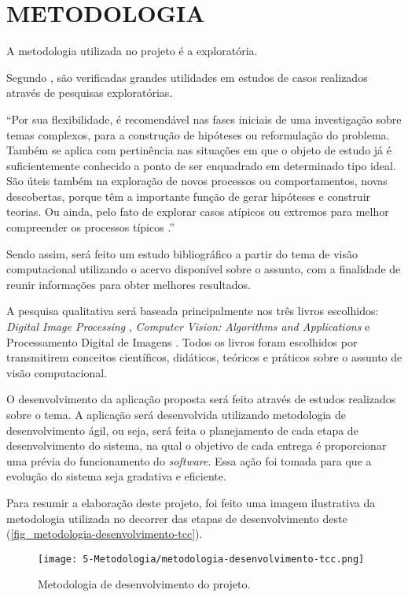 \chapter{\textbf{METODOLOGIA}}

A metodologia utilizada no projeto é a exploratória.

Segundo , são verificadas grandes utilidades em estudos de casos realizados através de pesquisas exploratórias.

\begin{citacao}
“Por sua flexibilidade, é recomendável nas fases iniciais de uma investigação sobre temas complexos, para a construção de hipóteses ou reformulação do problema. Também se aplica com pertinência nas situações em que o objeto de estudo já é suficientemente conhecido a ponto de ser enquadrado em determinado tipo ideal. São úteis também na exploração de novos processos ou comportamentos, novas descobertas, porque têm a importante função de gerar hipóteses e construir teorias. Ou ainda, pelo fato de explorar casos atípicos ou extremos para melhor compreender os processos típicos \cite{VENTURA2007}.”
\end{citacao}

Sendo assim, será feito um estudo bibliográfico a partir do tema de visão computacional utilizando o acervo disponível sobre o assunto, com a finalidade de reunir informações para obter melhores resultados.

A pesquisa qualitativa será baseada principalmente nos três livros escolhidos: \textit{Digital Image Processing} \cite{GONZALEZ2002},  \textit{Computer Vision: Algorithms and Applications} \cite{SZELISKI2010} e Processamento Digital de Imagens \cite{FILHO1999}. Todos os livros foram escolhidos por transmitirem conceitos científicos, didáticos, teóricos e práticos sobre o assunto de visão computacional.

O desenvolvimento da aplicação proposta será feito através de estudos realizados sobre o tema. A aplicação será desenvolvida utilizando metodologia de desenvolvimento ágil, ou seja, será feita o planejamento de cada etapa de desenvolvimento do sistema, na qual o objetivo de cada entrega é proporcionar uma prévia do funcionamento do \textit{software}. Essa ação foi tomada para que a evolução do sistema seja gradativa e eficiente.

Para resumir a elaboração deste projeto, foi feito uma imagem ilustrativa da metodologia utilizada no decorrer das etapas de desenvolvimento deste (\autoref{fig_metodologia-desenvolvimento-tcc}).

\begin{figure}[h]
	\caption{\label{fig_metodologia-desenvolvimento-tcc}Metodologia de desenvolvimento do projeto.}
	\begin{center}
		\texttt{[image: 5-Metodologia/metodologia-desenvolvimento-tcc.png]}
	\end{center}
	\centering {}
\end{figure}